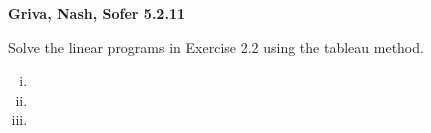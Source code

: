 \textbf{Griva, Nash, Sofer 5.2.11}

Solve the linear programs in Exercise 2.2 using the tableau method.

\begin{enumerate}[(i)]
  \item 
  \pagebreak
  \item 
  \pagebreak
  \setcounter{enumii}{4}
  \item 
\end{enumerate}